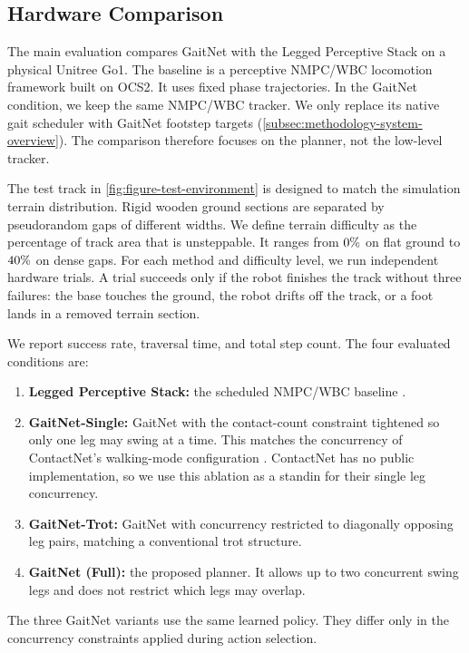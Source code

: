 
\subsection{Hardware Comparison}
\label{subsec:results-hardware-comparison}

The main evaluation compares GaitNet with the Legged Perceptive Stack
\cite{leggedperceptive} on a physical Unitree Go1. The baseline is a
perceptive NMPC/WBC locomotion framework built on OCS2. It uses fixed
phase trajectories. In the GaitNet condition, we keep the same
NMPC/WBC tracker. We only replace its native gait scheduler with
GaitNet footstep targets
(\autoref{subsec:methodology-system-overview}). The comparison
therefore focuses on the planner, not the low-level tracker.

The test track in \autoref{fig:figure-test-environment} is designed
to match the simulation terrain distribution. Rigid wooden ground
sections are separated by pseudorandom gaps of different widths. We
define terrain difficulty as the percentage of track area that is
unsteppable. It ranges from $0\%$ on flat ground to
$40\%$ on dense gaps. For each method and difficulty
level, we run \corlHwTrialsPerCell{} independent hardware trials. A
trial succeeds only if the robot finishes the track without three
failures: the base touches the ground, the robot drifts off the track,
or a foot lands in a removed terrain section.

We report success rate, traversal time, and total step count. The four
evaluated conditions are:
\begin{enumerate}
  \item \textbf{Legged Perceptive Stack:} the scheduled NMPC/WBC
    baseline \cite{leggedperceptive}.
  \item \textbf{GaitNet-Single:} GaitNet with the contact-count
    constraint tightened so only one leg may swing at a time. This
    matches the concurrency of ContactNet's walking-mode configuration
    \cite{bratta_contactnet_2024}. ContactNet has no public
    implementation, so we use this ablation as a standin for their
    single leg concurrency.
  \item \textbf{GaitNet-Trot:} GaitNet with concurrency restricted to
    diagonally opposing leg pairs, matching a conventional trot
    structure.
  \item \textbf{GaitNet (Full):} the proposed planner. It allows up to
    two concurrent swing legs and does not restrict which legs may
    overlap.
\end{enumerate}
The three GaitNet variants use the same learned policy. They differ
only in the concurrency constraints applied during action selection.

